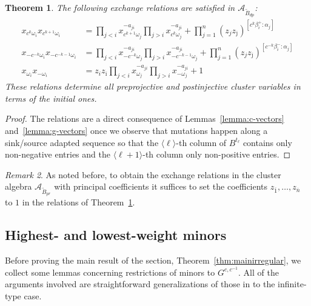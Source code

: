 \documentclass[12pt]{amsart}
\newcommand{\cA}{\mathcal{A}}
\renewcommand{\mod}[1]{\langle {#1} \rangle}
\newcommand{\ol}[1]{\overline{#1}}
\newcommand{\Bpr}{\widetilde{B}_{pr}}
\newcommand{\Bdp}{\widetilde{B}_{dp}}
\newcommand{\Zidx}{\ell}
\newcommand{\cvar}{z}
\newtheorem{theorem}{Theorem}[section]
\theoremstyle{remark}
\newtheorem{remark}[theorem]{Remark}
\numberwithin{equation}{section}
\numberwithin{figure}{section}
\begin{document}
\begin{theorem}
  \label{thm:vars_and_rels_in_bipartite_belt}
  The following exchange relations are satisfied in $\cA_{\Bdp}$:
  \begin{align}
    x_{c^k\omega_i}x_{c^{k+1}\omega_i}
    &=
    \prod_{j<i} x_{c^{k+1}\omega_j}^{-a_{ji}}
    \prod_{j>i} x_{c^k\omega_j}^{-a_{ji}}
    +
    \prod_{j=1}^n (z_j z_{\ol{\jmath}})^{[c^k\beta_i^+:\alpha_j]}
    \label{eq:preprojective}
    \\
    x_{-c^{-k}\omega_i}x_{-c^{-k-1}\omega_i}
    &=
    \prod_{j<i} x_{-c^{-k}\omega_j}^{-a_{ji}}
    \prod_{j>i} x_{-c^{-k-1}\omega_j}^{-a_{ji}}
    +
    \prod_{j=1}^n (z_j z_{\ol{\jmath}})^{[c^{-k}\beta_i^-:\alpha_j]}
    \label{eq:postinjective}
    \\
    x_{\omega_i}x_{-\omega_i}
    &=
    z_iz_{\ol{\imath}}
    \prod_{j<i} x_{\omega_j}^{-a_{ji}}
    \prod_{j>i} x_{-\omega_j}^{-a_{ji}}
    +
    1\label{eq:plusminus}
  \end{align}
  These relations determine all preprojective and postinjective cluster variables in terms of the initial ones.
\end{theorem}
\begin{proof}
  The relations are a direct consequence of Lemmas~\ref{lemma:c-vectors} and~\ref{lemma:g-vectors} once we observe that mutations happen along a sink/source adapted sequence so that the $\mod{\Zidx}$-th column of $B^{t_\Zidx}$ contains only non-negative entries and the $\mod{\Zidx+1}$-th column only non-positive entries.
\end{proof}
\begin{remark}
  As noted before, to obtain the exchange relations in the cluster algebra $\cA_{\Bpr}$ with principal coefficients it suffices to set the coefficients $\cvar_{\ol{1}},\dotsc,\cvar_{\ol{n}}$ to $1$ in the relations of Theorem~\ref{thm:vars_and_rels_in_bipartite_belt}.
\end{remark}

\subsection{Highest- and lowest-weight minors}
\label{sec:hlwminors}

Before proving the main result of the section, Theorem~\ref{thm:mainirregular}, we collect some lemmas concerning restrictions of minors to $G^{c,c^{-1}}$.
All of the arguments involved are straightforward generalizations of those in \cite{YZ08} to the infinite-type case.
\end{document}
